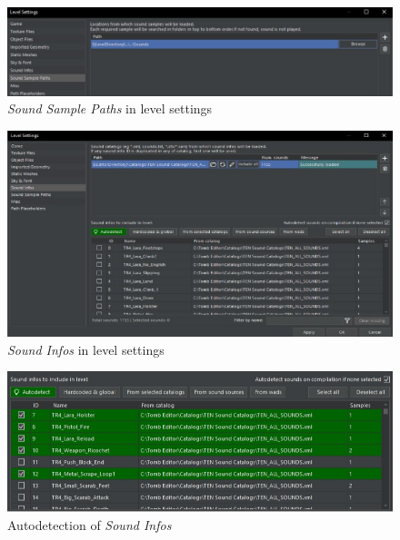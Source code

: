 \begin{figure}
    \centering
     \includegraphics[width=1\textwidth]{screenshots/1006.png}
     \caption{\emph{Sound Sample Paths} in level settings}
     \label{fig:TESoundSamplePaths} 
\end{figure}

\begin{figure}
    \centering
     \includegraphics[width=1\textwidth]{screenshots/1007.png}
     \caption{\emph{Sound Infos} in level settings}
     \label{fig:TESoundCatalogs} 
\end{figure}

\begin{figure}
    \centering
     \includegraphics[width=1\textwidth]{screenshots/16.jpg}
     \caption{Autodetection of \emph{Sound Infos}}
     \label{fig:TEAutoSoundInfos} 
\end{figure}


